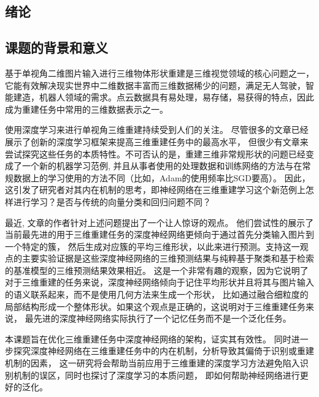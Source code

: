 \documentclass[bachelor, nocolorlinks, printoneside]{seuthesis} %
\begin{document}
\begin{Main} %

\chapter{绪论}

\section{课题的背景和意义}
基于单视角二维图片输入进行三维物体形状重建是三维视觉领域的核心问题之一，它能有效解决现实世界中二维数据丰富而三维数据稀少的问题，满足无人驾驶，智能建造，机器人领域的需求。点云数据具有易处理，易存储，易获得的特点，因此成为重建任务中常用的三维数据表示之一。

使用深度学习来进行单视角三维重建持续受到人们的关注。
尽管很多的文章已经展示了创新的深度学习框架来提高三维重建任务中的最高水平\cite{li2018point,park2019deepsdf,fan2017point,tatarchenko2017octree,groueix2018papier,yang2018foldingnet,wang2018pixel2mesh,sun2018pix3d,tulsiani2017multi,wu2017marrnet,yan2016perspective}，
但很少有文章来尝试探究这些任务的本质特性。不可否认的是，重建三维非常规形状的问题已经变成了一个新的机器学习范例, 
并且从事者使用的处理数据和训练网络的方法与在常规数据上的学习使用的方法不同（比如，Adam\cite{kingma2014adam}的使用频率比SGD要高）。
因此，这引发了研究者对其内在机制的思考，即神经网络在三维重建学习这个新范例上怎样进行学习？是否与传统的向量分类和回归问题不同？

最近, 文章\cite{tatarchenko2019single}的作者针对上述问题提出了一个让人惊讶的观点。
他们尝试性的展示了当前最先进的用于三维重建任务的深度神经网络更倾向于通过首先分类输入图片到一个特定的簇，
然后生成对应簇的平均三维形状，以此来进行预测。支持这一观点的主要实验证据是这些深度神经网络的三维预测结果与纯粹基于聚类和基于检索的基准模型的三维预测结果效果相近。
这是一个非常有趣的观察，因为它说明了对于三维重建的任务来说，深度神经网络倾向于记住平均形状并且将其与图片输入的语义联系起来，而不是使用几何方法来生成一个形状，
比如通过融合细粒度的局部结构形成一个整体形状。如果这个观点是正确的，这说明对于三维重建任务来说，
最先进的深度神经网络实际执行了一个记忆任务而不是一个泛化任务\cite{arpit2017closer}。

本课题旨在优化三维重建任务中深度神经网络的架构，证实其有效性。
同时进一步探究深度神经网络在三维重建任务中的内在机制，分析导致其偏倚于识别或重建机制的因素，
这一研究将会帮助当前应用于三维重建的深度学习方法避免陷入识别机制的误区，同时也探讨了深度学习的本质问题，
即如何帮助神经网络进行更好的泛化。


\end{Main}
\end{document}
